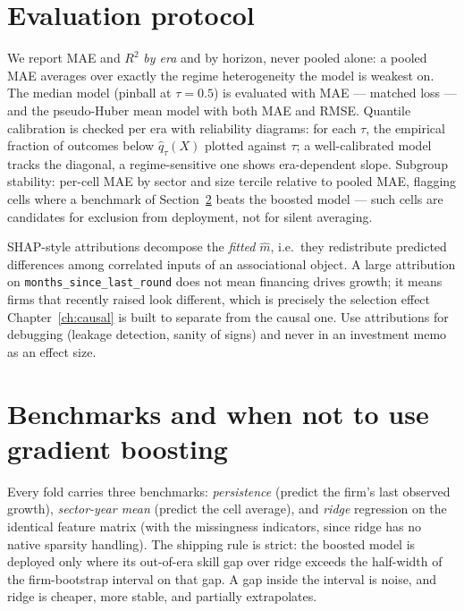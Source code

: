 \section{Evaluation protocol}
\label{sec:xgb-eval}

We report MAE and $R^2$ \emph{by era} and by horizon, never pooled alone: a pooled MAE
averages over exactly the regime heterogeneity the model is weakest on. The median model
(pinball at $\tau = 0.5$) is evaluated with MAE --- matched loss --- and the pseudo-Huber
mean model with both MAE and RMSE. Quantile calibration is checked per era with
reliability diagrams: for each $\tau$, the empirical fraction of outcomes below
$\hat q_\tau(X)$ plotted against $\tau$; a well-calibrated model tracks the diagonal, a
regime-sensitive one shows era-dependent slope. Subgroup stability: per-cell MAE by
sector and size tercile relative to pooled MAE, flagging cells where a benchmark of
Section~\ref{sec:xgb-bench} beats the boosted model --- such cells are candidates for
exclusion from deployment, not for silent averaging.

\begin{warning}
\label{warn:xgb-shap}
SHAP-style attributions decompose the \emph{fitted} $\hat m$, i.e.\ they redistribute
predicted differences among correlated inputs of an associational object. A large
attribution on \texttt{months\_since\_last\_round} does not mean financing drives
growth; it means firms that recently raised look different, which is precisely the
selection effect Chapter~\ref{ch:causal} is built to separate from the causal one. Use
attributions for debugging (leakage detection, sanity of signs) and never in an
investment memo as an effect size.
\end{warning}

\section{Benchmarks and when not to use gradient boosting}
\label{sec:xgb-bench}

Every fold carries three benchmarks: \emph{persistence} (predict the firm's last
observed growth), \emph{sector-year mean} (predict the cell average), and \emph{ridge}
regression on the identical feature matrix (with the missingness indicators, since ridge
has no native sparsity handling). The shipping rule is strict: the boosted model is
deployed only where its out-of-era skill gap over ridge exceeds the half-width of the
firm-bootstrap interval on that gap. A gap inside the interval is noise, and ridge is
cheaper, more stable, and partially extrapolates.

